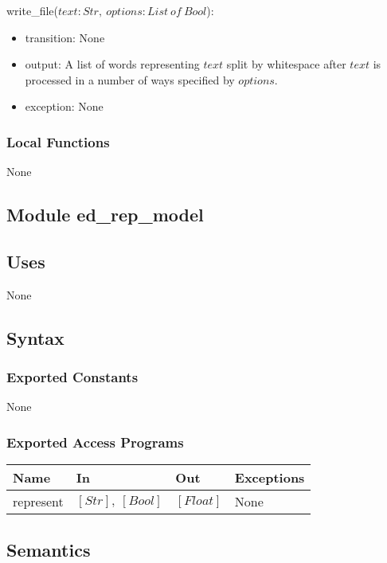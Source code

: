 \documentclass[12pt, titlepage]{article}
\begin{document}
\noindent write\_file($text: Str,\ options: List\ of\ Bool$):
\begin{itemize}
\item transition: None
\item output: A list of words representing $text$ split by whitespace after $text$ is processed in a number of ways specified by $options$.
\item exception: None
\end{itemize}

\subsubsection{Local Functions}

None


\subsection{Module ed\_rep\_model}

\subsection{Uses}

None

\subsection{Syntax}

\subsubsection{Exported Constants}

None

\subsubsection{Exported Access Programs}

\begin{center}
\begin{tabular}{p{3cm} p{4cm} p{4cm} p{3cm}}
\hline
\textbf{Name} & \textbf{In} & \textbf{Out} & \textbf{Exceptions} \\
\hline
represent & $[Str],\ [Bool]$ & $[Float]$ & None \\
\hline
\end{tabular}
\end{center}

\subsection{Semantics}
\end{document}
